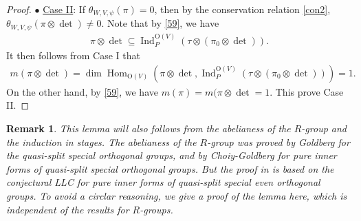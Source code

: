 \documentclass[article]{article}
\numberwithin{equation}{section}
\newtheorem{remark}[theorem]{Remark}
\theoremstyle{definition}
\DeclareMathOperator{\Hom}{Hom}
\DeclareMathOperator{\Ind}{Ind}
\begin{document}
\begin{proof}
$\bullet$ \underline{Case II}: If $\theta_{ W,V,\psi}(\pi)=0$, then by the conservation relation \ref{con2}, $\theta_{ W,V,\psi}(\pi\otimes\det)\neq 0$. Note that by \ref{59}, we have 
		\begin{align*}
		\pi\otimes\det \subseteq \Ind_{P}^{\mathrm O(V)}(\tau\otimes (\pi_0\otimes\det)). 
		\end{align*} 
		 It then follows from Case I that  
		\begin{align*}
		m(\pi\otimes\det)=\dim \Hom_{\mathrm O(V)}(\pi\otimes\det, \Ind_{P}^{\mathrm O(V)}(\tau\otimes (\pi_0\otimes\det)))=1. 
		\end{align*}
		On the other hand, by \ref{59}, we have $m(\pi)=m(\pi\otimes \det=1$. This prove Case II. 
\end{proof}
\begin{remark}
	This lemma will also follows from the abelianess of the $R$-group and the induction in stages. The abelianess of the $R$-group was proved by Goldberg \cite{MR1296726} for the quasi-split special orthogonal groups, and by Choiy-Goldberg \cite{MR3430367} for pure inner forms of quasi-split special orthogonal groups. But the proof in \cite{MR3430367} is based on the conjectural LLC for pure inner forms of quasi-split special even orthogonal groups. To avoid a circlar reasoning, we give a proof of the lemma here, which is independent of the results for $R$-groups. 
\end{remark}
\end{document}
